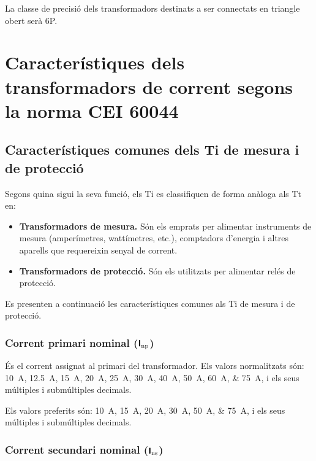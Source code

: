 La classe de precisió dels transformadors destinats a ser connectats en triangle obert serà 6P.

\section{Característiques dels transformadors de corrent segons la norma  CEI 60044}

\subsection{Característiques comunes dels Ti de mesura i de protecció}

Segons quina sigui la seva funció, els Ti es classifiquen de forma
anàloga als Tt en:
\begin{itemize}
	\item \textbf{Transformadors de mesura.} Són els emprats per alimentar
	instruments de mesura (amperímetres, wattímetres, etc.),
	comptadors d'energia i altres aparells que requereixin senyal de corrent.
	\item \textbf{Transformadors de protecció.} Són els utilitzats per
	alimentar relés de protecció.
\end{itemize}			

Es presenten a continuació les característiques comunes als Ti de
mesura i de protecció.


\subsubsection{Corrent primari nominal (${\boldsymbol{\mathsf{I_\text{np}}}}$)}

 És el corrent assignat al
primari del transformador. Els valors normalitzats
són: \qtylist{10; 12,5; 15; 20; 25;30; 40; 50; 60;75}{A}, i els
seus múltiples i submúltiples decimals.

Els valors preferits són: \qtylist{10; 15; 20; 30; 50;75}{A}, i els
seus múltiples i submúltiples decimals.


\subsubsection{Corrent secundari nominal (${\boldsymbol{\mathsf{I_\text{ns}}}}$)}

